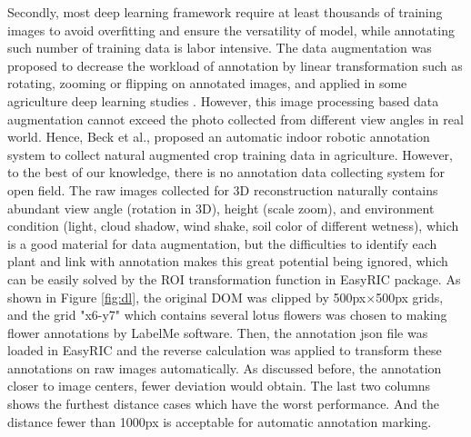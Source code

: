 \documentclass[doublespacing]{configs/bmcart}
\begin{document}
Secondly, most deep learning framework require at least thousands of training images to avoid overfitting and ensure the versatility of model, while annotating such number of training data is labor intensive. The data augmentation was proposed to decrease the workload of annotation by linear transformation such as rotating, zooming or flipping on annotated images, and applied in some agriculture deep learning studies \cite{zhou_fast_2020, han_real-time_2020}. However, this image processing based data augmentation cannot exceed the photo collected from different view angles in real world. Hence, Beck et al.,\cite{beck_embedded_2020} proposed an automatic indoor robotic annotation system to collect natural augmented crop training data in agriculture. However, to the best of our knowledge, there is no annotation data collecting system for open field. The raw images collected for 3D reconstruction naturally contains abundant view angle (rotation in 3D), height (scale zoom), and environment condition (light, cloud shadow, wind shake, soil color of different wetness), which is a good material for data augmentation, but the difficulties to identify each plant and link with annotation makes this great potential being ignored, which can be easily solved by the ROI transformation function in EasyRIC package. As shown in Figure \ref{fig:dl}, the original DOM was clipped by 500px$\times$500px grids, and the grid "x6-y7" which contains several lotus flowers was chosen to making flower annotations by LabelMe software. Then, the annotation json file was loaded in EasyRIC and the reverse calculation was applied to transform these annotations on raw images automatically. As discussed before, the annotation closer to image centers, fewer deviation would obtain. The last two columns shows the furthest distance cases which have the worst performance. And the distance fewer than 1000px is acceptable for automatic annotation marking.
\end{document}
